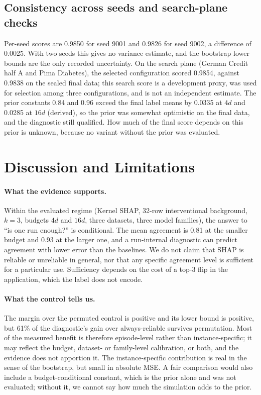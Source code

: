 \documentclass{article}
\begin{document}
\subsection{Consistency across seeds and search-plane checks}
Per-seed scores are 0.9850 for seed 9001 and 0.9826 for seed 9002, a difference of 0.0025. With two seeds this gives no variance estimate, and the bootstrap lower bounds are the only recorded uncertainty. %
On the search plane (German Credit half A and Pima Diabetes), the selected configuration scored 0.9854, against 0.9838 on the sealed final data; this search score is a development proxy, was used for selection among three configurations, and is not an independent estimate. The prior constants 0.84 and 0.96 exceed the final label means by 0.0335 at $4d$ and 0.0285 at $16d$ (derived), so the prior was somewhat optimistic on the final data, and the diagnostic still qualified. %
 How much of the final score depends on this prior is unknown, because no variant without the prior was evaluated.

\section{Discussion and Limitations}\label{sec:limits}
\paragraph{What the evidence supports.}
Within the evaluated regime (Kernel SHAP, 32-row interventional background, $k=3$, budgets $4d$ and $16d$, three datasets, three model families), the answer to ``is one run enough?'' is conditional. The mean agreement is 0.81 at the smaller budget and 0.93 at the larger one, and a run-internal diagnostic can predict agreement with lower error than the baselines. We do not claim that SHAP is reliable or unreliable in general, nor that any specific agreement level is sufficient for a particular use. Sufficiency depends on the cost of a top-3 flip in the application, which the label does not encode.

\paragraph{What the control tells us.}
The margin over the permuted control is positive and its lower bound is positive, but 61\% of the diagnostic's gain over always-reliable survives permutation. Most of the measured benefit is therefore episode-level rather than instance-specific; it may reflect the budget, dataset- or family-level calibration, or both, and the evidence does not apportion it. The instance-specific contribution is real in the sense of the bootstrap, but small in absolute MSE. A fair comparison would also include a budget-conditional constant, which is the prior alone and was not evaluated; without it, we cannot say how much the simulation adds to the prior.
\end{document}

